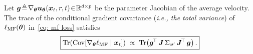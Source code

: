 \begin{appendices}
    \begin{theorem}
        Let ${\bm{g}}\!\triangleq\!\nabla_{{\bm{\theta}}}{\bm{u}}_{{\bm{\theta}}}({\bm{x}}_{t},r,t)\!\in\!\mathbb{R}^{d\times p}$ be the parameter Jacobian of the average velocity. The trace of the conditional gradient covariance (\textit{i.e., the total variance}) of $\ell_{\text{MF}}({\bm{\theta}})$ in~\eqref{eq: mf-loss} satisfies
        \begin{equation*}
            \boxed{
                \operatorname{Tr}\!\left(\mathrm{Cov}\!\left[\nabla_{{\bm{\theta}}}\ell_{\text{MF}}\mid{\bm{x}}_{t}\right]\right)
                \;\propto\;
                \operatorname{Tr}\!\left({\bm{g}}^{\!\top}\,{\bm{J}}\,\Sigma_{{\bm{v}}^{\prime}}\,{\bm{J}}^{\!\top}\,{\bm{g}}\right).
            }
        \end{equation*}
    \end{theorem}


\end{appendices}
